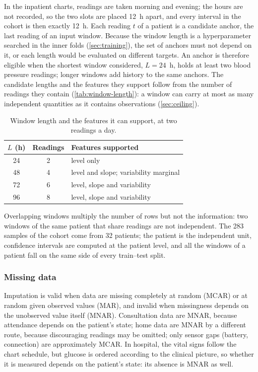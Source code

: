 In the inpatient charts, readings are taken morning and evening; the hours are not recorded, so the two slots are placed 12~h apart, and every interval in the cohort is then exactly 12~h. Each reading $t$ of a patient is a candidate anchor, the last reading of an input window. Because the window length is a hyperparameter searched in the inner folds (\cref{sec:training}), the set of anchors must not depend on it, or each length would be evaluated on different targets. An anchor is therefore eligible when the shortest window considered, $L = 24$~h, holds at least two blood pressure readings; longer windows add history to the same anchors. The candidate lengths and the features they support follow from the number of readings they contain (\cref{tab:window-length}): a window can carry at most as many independent quantities as it contains observations (\cref{sec:ceiling}).

\begin{table}[htbp]
\centering\small
\caption{Window length and the features it can support, at two readings a day.}\label{tab:window-length}\label{tab:ceiling}
\begin{tabular}{@{}ccl@{}}
\toprule
\textbf{$L$ (h)} & \textbf{Readings} & \textbf{Features supported} \\
\midrule
24 & 2 & level only \\
48 & 4 & level and slope; variability marginal \\
72 & 6 & level, slope and variability \\
96 & 8 & level, slope and variability \\
\bottomrule
\end{tabular}
\end{table}

Overlapping windows multiply the number of rows but not the information: two windows of the same patient that share readings are not independent. The 283 samples of the cohort come from 32 patients; the patient is the independent unit, confidence intervals are computed at the patient level, and all the windows of a patient fall on the same side of every train--test split.

\subsubsection{Missing data}\label{sec:missingness}\label{sec:bias-direction}\label{sec:masking}\label{sec:mask-models}

Imputation is valid when data are missing completely at random (MCAR) or at random given observed values (MAR), and invalid when missingness depends on the unobserved value itself (MNAR). Consultation data are MNAR, because attendance depends on the patient's state; home data are MNAR by a different route, because discouraging readings may be omitted; only sensor gaps (battery, connection) are approximately MCAR. In hospital, the vital signs follow the chart schedule, but glucose is ordered according to the clinical picture, so whether it is measured depends on the patient's state: its absence is MNAR as well.

